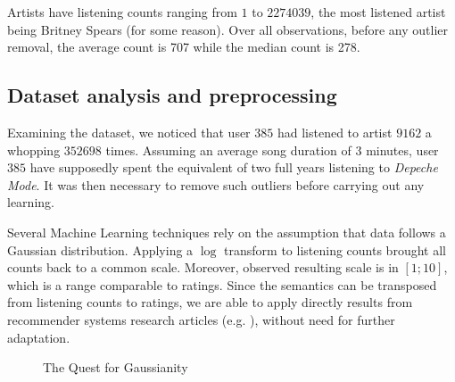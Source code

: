\documentclass{article}
\begin{document}
  Artists have listening counts ranging from $1$ to $2274039$, the most listened artist being Britney Spears (for some reason). Over all observations, before any outlier removal, the average count is 707 while the median count is 278.\\

  \subsection{Dataset analysis and preprocessing}
  Examining the dataset, we noticed that user $385$ had listened to artist $9162$ a whopping $352698$ times. Assuming an average song duration of $3$ minutes, user $385$ have supposedly spent the equivalent of two full years listening to \textit{Depeche Mode}. It was then necessary to remove such outliers before carrying out any learning.

  Several Machine Learning techniques rely on the assumption that data follows a Gaussian distribution. Applying a $\log$ transform to listening counts brought all counts back to a common scale. Moreover, observed resulting scale is in $[1;10]$, which is a range comparable to ratings. Since the semantics can be transposed from listening counts to ratings, we are able to apply directly results from recommender systems research articles (e.g. \cite{alswr}), without need for further adaptation.

  \begin{figure}[ht]
    \center
    \caption{The Quest for Gaussianity}
    \label{fig:recommendation-normalization}
  \end{figure}
\end{document}
